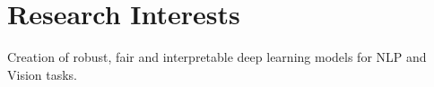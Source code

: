 \section{Research Interests}
Creation of robust, fair and interpretable deep learning models for NLP and Vision tasks.
